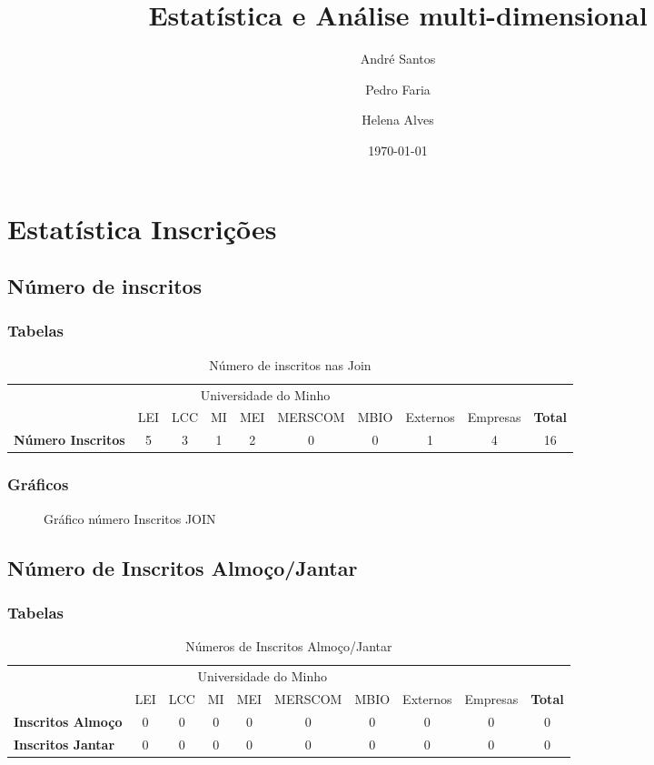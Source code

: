 \documentclass[a4paper]{article}
\title{Estatística e Análise multi-dimensional}
\author{André Santos \and Pedro Faria \and Helena Alves}
\date{\today}
\begin{document}
 
 \maketitle
 \tableofcontents 
 \newpage
 \section{Estatística Inscrições} 
 \subsection{Número de inscritos}
 \subsubsection{Tabelas} 
 
 \begin{table}[hl] 
 \begin{tabular}{|l|c|c|c|c|c|c|c|c|c|}  
 \cline{2-7} 
 \multicolumn{1}{c}{} & \multicolumn{6}{|c|}{Universidade do Minho} & \multicolumn{3}{c}{} \\ 
 \cline{2-10} 
 \multicolumn{1}{c|}{} & LEI & LCC & MI & MEI & MERSCOM & MBIO & Externos & Empresas & \textbf{Total} \\ 
 \hline  
 \textbf{Número Inscritos} &5&3&1&2&0&0&1&4&16 \\  
 \hline  
 \end{tabular} 
 \caption{Número de inscritos nas Join} 
 \end{table} 
 \subsubsection{Gráficos} 
 \begin{figure}[h] 
 \centering 
  
 \caption{Gráfico número Inscritos JOIN} 
 \end{figure} \newpage
 \subsection{Número de Inscritos Almoço/Jantar}
 \subsubsection{Tabelas} 
 
 \begin{table}[hl] 
 \begin{tabular}{|l|c|c|c|c|c|c|c|c|c|}  
 \cline{2-7} 
 \multicolumn{1}{c}{} & \multicolumn{6}{|c|}{Universidade do Minho} & \multicolumn{3}{c}{} \\ 
 \cline{2-10} 
 \multicolumn{1}{c|}{} & LEI & LCC & MI & MEI & MERSCOM & MBIO & Externos & Empresas & \textbf{Total} \\ 
 \hline 
 \textbf{Inscritos Almoço} &0&0&0&0&0&0&0&0& 0\\  
 \hline  
 \textbf{Inscritos Jantar} &0&0&0&0&0&0&0&0& 0 \\  
 \hline  
  
 \end{tabular}  
 \caption{Números de Inscritos Almoço/Jantar} 
 \end{table}
 
\end{document}
